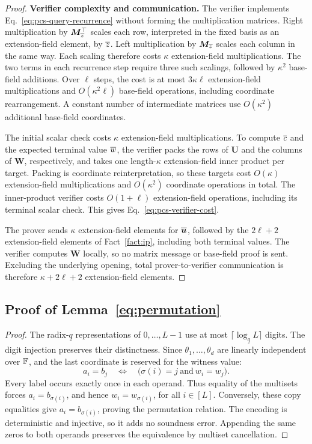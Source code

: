 \begin{proof}
\smallskip\noindent\textbf{Verifier complexity and communication.}
The verifier implements Eq.~\eqref{eq:pcs-query-recurrence}
without forming the multiplication matrices.
Right multiplication by \(\bm M_{\overline{z}}^\top\) scales each
row, interpreted in the fixed basis as an extension-field element,
by \(\overline{z}\). Left multiplication by \(\bm M_{\overline{z}}\)
scales each column in the same way. Each scaling therefore costs
\(\kappa\) extension-field multiplications.
The two terms in each recurrence step require three such scalings,
followed by \(\kappa^2\) base-field additions.
Over \(\ell\) steps, the cost is at most
\(3\kappa\ell\) extension-field multiplications and
\(O(\kappa^2\ell)\) base-field operations, including coordinate
rearrangement. A constant number of intermediate matrices use
\(O(\kappa^2)\) additional base-field coordinates.

The initial scalar check costs \(\kappa\) extension-field
multiplications. To compute \(\overline{c}\) and the expected terminal
value \(\overline{w}\), the verifier packs the rows of \(\bm U\) and
the columns of \(\bm W\), respectively, and takes one
length-\(\kappa\) extension-field inner product per target.
Packing is coordinate reinterpretation, so these targets
cost \(O(\kappa)\) extension-field multiplications and
\(O(\kappa^2)\) coordinate operations in total.
The inner-product verifier costs \(O(1+\ell)\) extension-field
operations, including its terminal scalar check.
This gives Eq.~\eqref{eq:pcs-verifier-cost}.

The prover sends \(\kappa\) extension-field elements for
\(\overline{\bm u}\), followed by the \(2\ell+2\) extension-field
elements of Fact~\ref{fact:ip}, including both terminal values.
The verifier computes \(\bm W\) locally, so no matrix message or
base-field proof is sent. Excluding the underlying opening, total
prover-to-verifier communication is therefore
\(\kappa+2\ell+2\) extension-field elements.
\end{proof}

\subsection{Proof of Lemma~\ref{eq:permutation}}
\label{appx:proof-copy-constraint}

\begin{proof}
The radix-\(\underline q\) representations of \(0,\ldots,L-1\)
use at most \(\lceil\log_{\underline q}L\rceil\) digits.
The digit injection preserves their distinctness.
Since \(\theta_1,\ldots,\theta_d\) are linearly independent
over \({\mathbb{F}}\), and the last coordinate is reserved for the
witness value:
\[
    a_i=b_j
    \quad\Longleftrightarrow\quad
    \bigl(\sigma(i)=j\ \text{and}\ w_i=w_j\bigr).
\]
Every label occurs exactly once in each operand.
Thus equality of the multisets forces
\(a_i=b_{\sigma(i)}\), and hence \(w_i=w_{\sigma(i)}\),
for all \(i\in[L]\).
Conversely, these copy equalities give
\(a_i=b_{\sigma(i)}\), proving the permutation relation.
The encoding is deterministic and injective, so it adds no
soundness error. Appending the same zeros to both operands
preserves the equivalence by multiset cancellation.
\end{proof}

